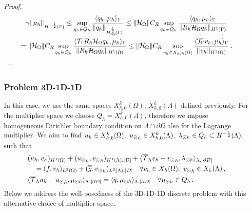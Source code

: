 \documentclass[r]{siamart171218}
\newcommand{\paolo}[1]{{\color{black}#1}}
\begin{document}
\begin{proof}
\begin{multline*}
\gamma \|\mu_h\|_{H^{-\frac 12}(\Gamma)} 
\leq 
\sup_{q_h \in Q_h} \frac{ \langle q_h, \mu_h \rangle_{\Gamma} } {\|q_h\|_{H^{\frac 12}_{00}(\Gamma)}} 
\leq
\|\mathcal{H}_{\Omega}\| C_R \sup_{q_h \in Q_h} \frac{ \langle q_h, \mu_h \rangle_{\Gamma} } {\|R_h \mathcal{H}_{\Omega} q_h\|_{H^1(\Gamma)}}
\\
=
\|\mathcal{H}_{\Omega}\| C_R \sup_{q_h \in Q_h} \frac{ \langle {\mathcal{T}_\Gamma} R_h  \mathcal{H}_{\Omega}q_h, \mu_h \rangle_{\Gamma} } {\|R_h \mathcal{H}_{\Omega} q_h\|_{H^1(\Omega)}} 
\leq \|\mathcal{H}_{\Omega}\| C_R \sup_{v_h \in X_{h,k}(\Omega)} \frac{ \langle {\mathcal{T}_\Gamma} v_h, \mu_h \rangle_{\Gamma} } {\|v_h\|_{H^1(\Omega)}}\,. 
\end{multline*}
\end{proof}


\subsubsection{Problem 3D-1D-1D}
In this case, we use the same spaces $X_{h,0}^k(\Omega)$, $X_{h,0}^k(\Lambda)$ defined previously.
For the multiplier space we choose $Q_h=X_{h,0}^k(\Lambda)$, therefore we impose homogeneous Dirichlet boundary condition on $\Lambda \cap \partial \Omega$ also for the Lagrange multiplier. 
We aim to find  $u_h \in X_{h,0}^k(\Omega) ,\ {u_{\odot}}_h \in X_{h,0}^k(\Lambda), \ \lambda_{\odot h} \in Q_h \subset H^{-\frac12}(\Lambda)$, such that
\begin{subequations}
\begin{align}\label{eq:prob2_discrete}
&(u_h,v_h)_{H^1(\Omega)} + ({\ud}_h,{\vd}_h)_{H^1(\Lambda), |{\cal D}|} 
+  \langle  \mtrace v_h -  {\vd}_h, \ldh \rangle_{\Lambda, |\DD|} 
\\
\nonumber
&\quad = (f,v_h)_{L^2(\Omega)} + (\avrd{g},{\vd}_h)_{L^2(\Lambda),|\D|}
\quad \forall v_h \in X_h(\Omega), \ {\vd}_h \in X_h(\Lambda)\,,
\\
& \langle \mtrace u_h - {\ud}_h, \mdh \rangle_{\Lambda,| \DD| } 
= \paolo{\langle \avrc{q},\mdh \rangle_{\Lambda,|\DD|}}
\quad \forall \mdh \in Q_h\,.
\end{align}
\end{subequations}
Below we address the well-posedness of the 3D-1D-1D discrete problem with this alternative choice of multiplier space.
\end{document}
